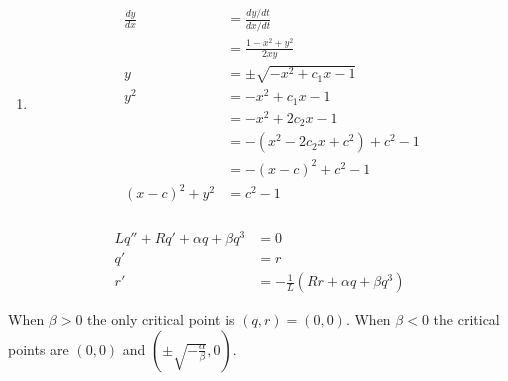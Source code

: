 \documentclass{article}
\begin{document}
\begin{enumerate}
  \item

        \begin{align*}
          \frac{d y}{d x} & = \frac{d y / d t}{d x / d t}      \\
                          & = \frac{1 - x^2 + y^2}{2 x y}      \\
          y               & = \pm \sqrt{-x^2 + c_1 x - 1}      \\
          y^2             & = -x^2 + c_1 x - 1                 \\
                          & = -x^2 + 2 c_2 x - 1               \\
                          & = -(x^2 - 2 c_2 x + c^2) + c^2 - 1 \\
                          & = -(x - c)^2 + c^2 - 1             \\
          (x - c)^2 + y^2 & = c^2 - 1
        \end{align*}
\end{enumerate}

\setcounter{subsubsection}{36}
\subsubsection{}

\begin{align*}
  L q'' + R q' + \alpha q + \beta q^3 & = 0                                         \\
  q'                                  & = r                                         \\
  r'                                  & = -\frac{1}{L} (R r + \alpha q + \beta q^3)
\end{align*}

When $\beta > 0$ the only critical point is $(q, r) = (0, 0)$. When $\beta < 0$ the critical points are $(0, 0)$ and $\left( \pm \sqrt{-\frac{\alpha}{\beta}}, 0 \right)$.
\end{document}
